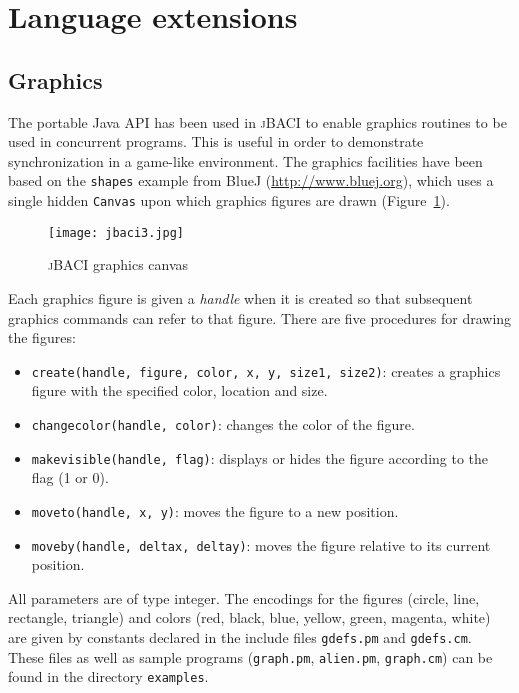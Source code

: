 \documentclass[11pt]{article}
\newcommand{\jb}{\textsc{\sffamily jBACI}}
\newcommand{\p}[1]{\texttt{#1}}
\newcommand{\bu}[1]{\textsf{#1}}
\begin{document}
\newpage

\section{Language extensions}

\subsection{Graphics}

The portable Java API has been used in \jb{}
to enable graphics routines to be used in concurrent programs.
This is useful in order to demonstrate synchronization in a game-like
environment.
The graphics facilities have been based on the
\p{shapes} example from \bu{BlueJ} (\url{http://www.bluej.org}),
which uses a single hidden
\p{Canvas} upon which graphics figures are drawn (Figure~\ref{fig.3}).
\begin{figure}[hbtp]
\begin{center}
\texttt{[image: jbaci3.jpg]}
\caption{\jb{} graphics canvas}\label{fig.3}
\end{center}
\end{figure}

Each graphics figure is given a \emph{handle} when it is created
so that subsequent graphics commands can refer to that figure.
There are five procedures for drawing the figures:
\begin{itemize}
\item \p{create(handle, figure, color, x, y, size1, size2)}:
creates a graphics figure with the specified color,
location and size.
\item \p{changecolor(handle, color)}: changes the color of the figure.
\item \p{makevisible(handle, flag)}: displays or hides the figure
according to the flag (1 or 0).
\item \p{moveto(handle, x, y)}: moves the figure to a new position.
\item \p{moveby(handle, deltax, deltay)}: moves the figure
relative to its current position.
\end{itemize}
All parameters are of type integer.
The encodings for the figures (circle, line, rectangle, triangle)
and colors (red, black, blue, yellow, green, magenta, white)
are given by constants declared
in the include files \p{gdefs.pm} and \p{gdefs.cm}.
These files as well as sample programs (\p{graph.pm}, \p{alien.pm},
\p{graph.cm}) can be found in the directory \p{examples}.
\end{document}
